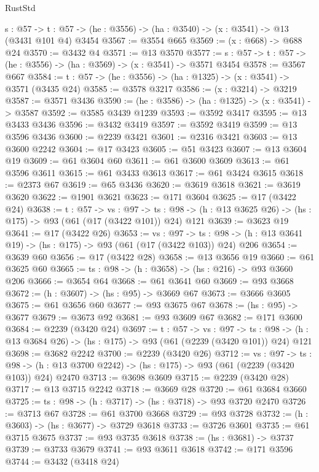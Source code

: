 \begin{lexlean}{RustStd}
\begin{coremodule}
  {s : @57} -> {t : @57} -> (he : @3556) -> (ha : @3540) -> (x : @3541) -> @13 (@3431 @101 @4) @3454
@3567 := @3554 @665
@3569 := (x : @668) -> @688 @24
@3570 := @3432 @4
@3571 := @13 @3570
@3577 := {s : @57} -> {t : @57} -> (he : @3556) -> (ha : @3569) -> (x : @3541) -> @3571 @3454
@3578 := @3567 @667
@3584 := {t : @57} -> (he : @3556) -> (ha : @1325) -> (x : @3541) -> @3571 (@3435 @24)
@3585 := @3578 @3217
@3586 := (x : @3214) -> @3219
@3587 := @3571 @3436
@3590 := (he : @3586) -> (ha : @1325) -> (x : @3541) -> @3587
@3592 := @3585 @3439 @1239
@3593 := @3592 @3417
@3595 := @13 @3433 @3436
@3596 := @3432 @3419
@3597 := @3592 @3419
@3599 := @13 @3596 @3436
@3600 := @2239 @3421
@3601 := @2316 @3421
@3603 := @13 @3600 @2242
@3604 := @17 @3423
@3605 := @51 @3423
@3607 := @13 @3604 @19
@3609 := @61 @3604 @60
@3611 := @61 @3600 @3609
@3613 := @61 @3596 @3611
@3615 := @61 @3433 @3613
@3617 := @61 @3424 @3615
@3618 := @2373 @67
@3619 := @65 @3436
@3620 := @3619 @3618
@3621 := @3619 @3620
@3622 := @1901 @3621
@3623 := @171 @3604
@3625 := @17 (@3422 @24)
@3638 := {t : @57} ->
  {vs : @97} ->
  {ts : @98} -> (h : @13 @3625 @26) -> (hs : @175) -> @93 (@61 (@17 (@3422 @101)) @24) @121
@3639 := @3623 @19
@3641 := @17 (@3422 @26)
@3653 := {vs : @97} ->
  {ts : @98} -> (h : @13 @3641 @19) -> (hs : @175) -> @93 (@61 (@17 (@3422 @103)) @24) @206
@3654 := @3639 @60
@3656 := @17 (@3422 @28)
@3658 := @13 @3656 @19
@3660 := @61 @3625 @60
@3665 := {ts : @98} -> (h : @3658) -> (hs : @216) -> @93 @3660 @206
@3666 := @3654 @64
@3668 := @61 @3641 @60
@3669 := @93 @3668
@3672 := (h : @3607) -> (hs : @95) -> @3669 @67
@3673 := @3666 @3605
@3675 := @61 @3656 @60
@3677 := @93 @3675 @67
@3678 := (hs : @95) -> @3677
@3679 := @3673 @92
@3681 := @93 @3609 @67
@3682 := @171 @3600
@3684 := @2239 (@3420 @24)
@3697 := {t : @57} ->
  {vs : @97} ->
  {ts : @98} -> (h : @13 @3684 @26) -> (hs : @175) -> @93 (@61 (@2239 (@3420 @101)) @24) @121
@3698 := @3682 @2242
@3700 := @2239 (@3420 @26)
@3712 := {vs : @97} ->
  {ts : @98} -> (h : @13 @3700 @2242) -> (hs : @175) -> @93 (@61 (@2239 (@3420 @103)) @24) @2470
@3713 := @3698 @3609
@3715 := @2239 (@3420 @28)
@3717 := @13 @3715 @2242
@3718 := @3669 @28
@3720 := @61 @3684 @3660
@3725 := {ts : @98} -> (h : @3717) -> (hs : @3718) -> @93 @3720 @2470
@3726 := @3713 @67
@3728 := @61 @3700 @3668
@3729 := @93 @3728
@3732 := (h : @3603) -> (hs : @3677) -> @3729 @3618
@3733 := @3726 @3601
@3735 := @61 @3715 @3675
@3737 := @93 @3735 @3618
@3738 := (hs : @3681) -> @3737
@3739 := @3733 @3679
@3741 := @93 @3611 @3618
@3742 := @171 @3596
@3744 := @3432 (@3418 @24)

\end{coremodule}
\end{lexlean}
